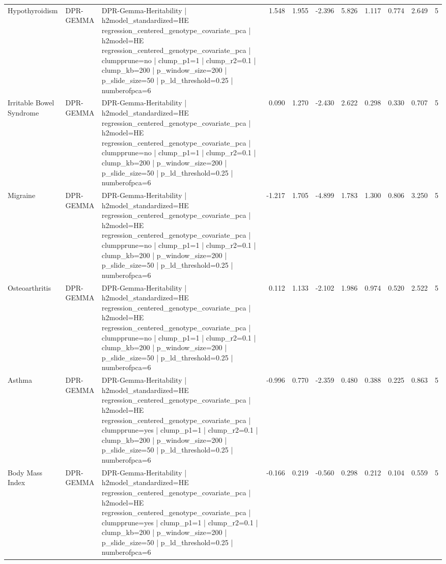 \begin{landscape}
\begin{longtable}{p{2.4cm}p{1.8cm}p{6.0cm}rrrrrrrr}
Hypothyroidism & DPR-GEMMA & DPR-Gemma-Heritability | h2model\_standardized=HE regression\_centered\_genotype\_covariate\_pca | h2model=HE regression\_centered\_genotype\_covariate\_pca | clumpprune=no | clump\_p1=1 | clump\_r2=0.1 | clump\_kb=200 | p\_window\_size=200 | p\_slide\_size=50 | p\_ld\_threshold=0.25 | numberofpca=6 & 1.548 & 1.955 & -2.396 & 5.826 & 1.117 & 0.774 & 2.649 & 5 \\
Irritable Bowel Syndrome & DPR-GEMMA & DPR-Gemma-Heritability | h2model\_standardized=HE regression\_centered\_genotype\_covariate\_pca | h2model=HE regression\_centered\_genotype\_covariate\_pca | clumpprune=no | clump\_p1=1 | clump\_r2=0.1 | clump\_kb=200 | p\_window\_size=200 | p\_slide\_size=50 | p\_ld\_threshold=0.25 | numberofpca=6 & 0.090 & 1.270 & -2.430 & 2.622 & 0.298 & 0.330 & 0.707 & 5 \\
Migraine & DPR-GEMMA & DPR-Gemma-Heritability | h2model\_standardized=HE regression\_centered\_genotype\_covariate\_pca | h2model=HE regression\_centered\_genotype\_covariate\_pca | clumpprune=no | clump\_p1=1 | clump\_r2=0.1 | clump\_kb=200 | p\_window\_size=200 | p\_slide\_size=50 | p\_ld\_threshold=0.25 | numberofpca=6 & -1.217 & 1.705 & -4.899 & 1.783 & 1.300 & 0.806 & 3.250 & 5 \\
Osteoarthritis & DPR-GEMMA & DPR-Gemma-Heritability | h2model\_standardized=HE regression\_centered\_genotype\_covariate\_pca | h2model=HE regression\_centered\_genotype\_covariate\_pca | clumpprune=no | clump\_p1=1 | clump\_r2=0.1 | clump\_kb=200 | p\_window\_size=200 | p\_slide\_size=50 | p\_ld\_threshold=0.25 | numberofpca=6 & 0.112 & 1.133 & -2.102 & 1.986 & 0.974 & 0.520 & 2.522 & 5 \\
Asthma & DPR-GEMMA & DPR-Gemma-Heritability | h2model\_standardized=HE regression\_centered\_genotype\_covariate\_pca | h2model=HE regression\_centered\_genotype\_covariate\_pca | clumpprune=yes | clump\_p1=1 | clump\_r2=0.1 | clump\_kb=200 | p\_window\_size=200 | p\_slide\_size=50 | p\_ld\_threshold=0.25 | numberofpca=6 & -0.996 & 0.770 & -2.359 & 0.480 & 0.388 & 0.225 & 0.863 & 5 \\
Body Mass Index & DPR-GEMMA & DPR-Gemma-Heritability | h2model\_standardized=HE regression\_centered\_genotype\_covariate\_pca | h2model=HE regression\_centered\_genotype\_covariate\_pca | clumpprune=yes | clump\_p1=1 | clump\_r2=0.1 | clump\_kb=200 | p\_window\_size=200 | p\_slide\_size=50 | p\_ld\_threshold=0.25 | numberofpca=6 & -0.166 & 0.219 & -0.560 & 0.298 & 0.212 & 0.104 & 0.559 & 5 \\

\end{longtable}
\end{landscape}

